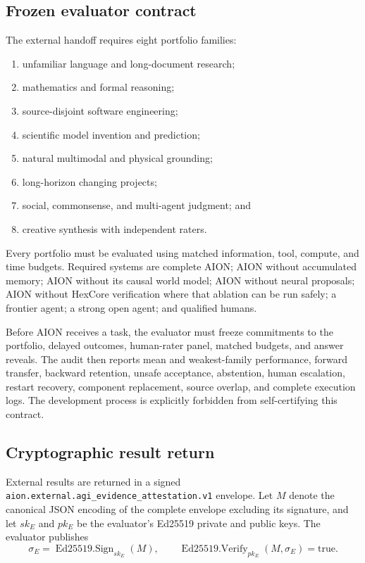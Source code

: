 \subsection{Frozen evaluator contract}
\label{subsec:agi-evaluator-contract}

The external handoff requires eight portfolio families:
\begin{enumerate}
  \item unfamiliar language and long-document research;
  \item mathematics and formal reasoning;
  \item source-disjoint software engineering;
  \item scientific model invention and prediction;
  \item natural multimodal and physical grounding;
  \item long-horizon changing projects;
  \item social, commonsense, and multi-agent judgment; and
  \item creative synthesis with independent raters.
\end{enumerate}

Every portfolio must be evaluated using matched information, tool, compute,
and time budgets.  Required systems are complete AION; AION without accumulated
memory; AION without its causal world model; AION without neural proposals;
AION without HexCore verification where that ablation can be run safely; a
frontier agent; a strong open agent; and qualified humans.

Before AION receives a task, the evaluator must freeze commitments to the
portfolio, delayed outcomes, human-rater panel, matched budgets, and answer
reveals.  The audit then reports mean and weakest-family performance, forward
transfer, backward retention, unsafe acceptance, abstention, human escalation,
restart recovery, component replacement, source overlap, and complete execution
logs.  The development process is explicitly forbidden from self-certifying
this contract.


\subsection{Cryptographic result return}
\label{subsec:agi-signed-return}

External results are returned in a signed
\texttt{aion.external.agi\_evidence\_attestation.v1} envelope.  Let $M$ denote
the canonical JSON encoding of the complete envelope excluding its signature,
and let $sk_E$ and $pk_E$ be the evaluator's Ed25519 private and public keys.
The evaluator publishes
\begin{equation}
\sigma_E=\operatorname{Ed25519.Sign}_{sk_E}(M),
\qquad
\operatorname{Ed25519.Verify}_{pk_E}(M,\sigma_E)=\mathrm{true}.
\label{eq:agi-ed25519-attestation}
\end{equation}

